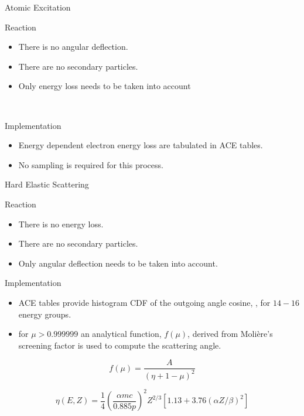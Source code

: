 \documentclass{beamer}
\begin{document}
\begin{frame}{Atomic Excitation}

  \begin{block}{Reaction}
    \begin{itemize}
      \item There is no angular deflection.
      \item There are no secondary particles.
      \item Only energy loss needs to be taken into account
    \end{itemize}
  \end{block}  

~~\\
  \begin{block}{Implementation}
    \begin{itemize}
      \item Energy dependent electron energy loss are tabulated in ACE tables.
      \item No sampling is required for this process.   
    \end{itemize}
  \end{block}  

\end{frame}

\begin{frame}{Hard Elastic Scattering}
  
  \begin{block}{Reaction}
    \begin{itemize}
      \item There is no energy loss.
      \item There are no secondary particles.
      \item Only angular deflection needs to be taken into account.
    \end{itemize}
  \end{block}  
      
  \begin{block}{Implementation}
    \begin{itemize}
      \item ACE tables provide histogram CDF of the outgoing angle cosine, \textmu, 
            for $14-16$ energy groups.
      \item for $\mu > 0.999999$ an analytical function, $f(\mu)$, derived from Moli\`ere's screening factor is used to compute the scattering angle.
    \end{itemize}

  \begin{equation*}
    f(\mu) = \frac{A}{(\eta + 1 - \mu)^2}
  \end{equation*}

  \begin{equation*}
    \eta(E,Z) = \frac{1}{4}\left(\frac{\alpha mc}{0.885p}\right)^2 Z^{2/3}[1.13+3.76(\alpha Z/\beta)^2]
  \end{equation*}
  
    \end{block}  


\end{frame}
\end{document}
